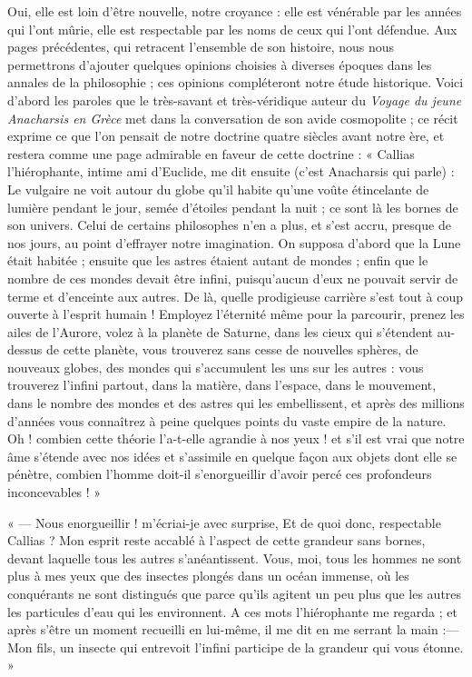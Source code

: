 \documentclass[a4paper, 11pt, oneside, landscape]{article}
\begin{document}
Oui, elle est loin d'être nouvelle, notre croyance : elle est vénérable par les années qui l'ont mûrie, elle est respectable par les noms de ceux qui l'ont défendue. Aux pages précédentes, qui retracent l'ensemble de son histoire, nous nous permettrons d'ajouter quelques opinions choisies à diverses époques dans les annales de la philosophie ; ces opinions compléteront notre étude historique. Voici d'abord les paroles que le très-savant et très-véridique auteur du \emph{Voyage du jeune Anacharsis en Grèce} met dans la conversation de son avide cosmopolite ; ce récit exprime ce que l'on pensait de notre doctrine quatre siècles avant notre ère, et restera comme une page admirable en faveur de cette doctrine : « Callias l'hiérophante, intime ami d'Euclide, me dit ensuite (c'est Anacharsis qui parle) : Le vulgaire ne voit autour du globe qu'il habite qu'une voûte étincelante de lumière pendant le jour, semée d'étoiles pendant la nuit ; ce sont là les bornes de son univers. Celui de certains philosophes n'en a plus, et s'est accru, presque de nos jours, au point d'effrayer notre imagination. On supposa d'abord que la Lune était habitée ; ensuite que les astres étaient autant de mondes ; enfin que le nombre de ces mondes devait être infini, puisqu'aucun d'eux ne pouvait servir de terme et d'enceinte aux autres. De là, quelle prodigieuse carrière s'est tout à coup ouverte à l'esprit humain ! Employez l'éternité même pour la parcourir, prenez les ailes de l'Aurore, volez à la planète de Saturne, dans les cieux qui s'étendent au-dessus de cette planète, vous trouverez sans cesse de nouvelles sphères, de nouveaux globes, des mondes qui s'accumulent les uns sur les autres : vous trouverez l'infini partout, dans la matière, dans l'espace, dans le mouvement, dans le nombre des mondes et des astres qui les embellissent, et après des millions d'années vous connaîtrez à peine quelques points du vaste empire de la nature. Oh ! combien cette théorie l'a-t-elle agrandie à nos yeux ! et s'il est vrai que notre âme s'étende avec nos idées et s'assimile en quelque façon aux objets dont elle se pénètre, combien l'homme doit-il s'enorgueillir d'avoir percé ces profondeurs inconcevables ! »

« --- Nous enorgueillir ! m'écriai-je avec surprise, Et de quoi donc, respectable Callias ? Mon esprit reste accablé à l'aspect de cette grandeur sans bornes, devant laquelle tous les autres s'anéantissent. Vous, moi, tous les hommes ne sont plus à mes yeux que des insectes plongés dans un océan immense, où les conquérants ne sont distingués que parce qu'ils agitent un peu plus que les autres les particules d'eau qui les environnent. A ces mots l'hiérophante me regarda ; et après s'être un moment recueilli en lui-même, il me dit en me serrant la main :--- Mon fils, un insecte qui entrevoit l'infini participe de la grandeur qui vous étonne. »
\end{document}

